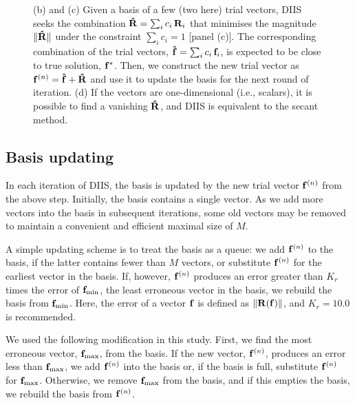 \documentclass{gMOS2e}
\begin{document}
\begin{figure}[h]
\begin{center}
{    %
    (b) and (c)
    Given a basis of a few (two here) trial vectors,
    DIIS seeks the combination
    $\mathbf{\hat R} = \sum_i c_i \, \mathbf{R}_i$
    that minimises the magnitude
    $\| \mathbf{\hat R} \|$
    under the constraint
    $\sum_i c_i = 1$ [panel (c)].
    The corresponding combination
    of the trial vectors,
    $\mathbf{\hat f} = \sum_i c_i \, \mathbf{f}_i$,
    is expected to be close to true solution, $\mathbf{f}^*$.
    Then,
    we construct
    the new trial vector as
    $\mathbf{f}^{(n)} = \mathbf{\hat f} + \mathbf{\hat R}$
    and use it to update the basis
    for the next round of iteration.
    (d) If the vectors are one-dimensional (i.e., scalars),
    it is possible to find a vanishing $\mathbf{\hat R}$, and
    DIIS is equivalent to the secant method.
  }
\end{center}
\end{figure}




\subsection{\label{sec:basis_updating}Basis updating}



In each iteration of DIIS,
the basis is updated
by the new trial vector $\mathbf{f}^{(n)}$
from the above step.
%
Initially,
the basis contains a single vector.
%
As we add more vectors into the basis in subsequent iterations,
some old vectors may be removed
to maintain a convenient and efficient maximal size of $M$.



A simple updating scheme\cite{kovalenko1999}
is to treat the basis as a queue:
%
we add $\mathbf{f}^{(n)}$ to the basis,
if the latter contains fewer than $M$ vectors,
%
or substitute $\mathbf{f}^{(n)}$ for the earliest vector in the basis.
%
If, however, $\mathbf{f}^{(n)}$
produces an error greater than
$K_r$ times the error of
$\mathbf{f}_\mathrm{min}$,
the least erroneous vector in the basis,
%
we rebuild the basis
from $\mathbf{f}_\mathrm{min}$.
%
Here, the error of a vector $\mathbf{f}$ is defined as
$\| \mathbf{R}(\mathbf{f}) \|$,
and
$K_r = 10.0$ is recommended\cite{
kovalenko1999}.



We used the following modification
in this study.
%
%
%
%
First, we find the most erroneous vector,
$\mathbf{f}_\mathrm{max}$, from the basis.
%
If the new vector, $\mathbf{f}^{(n)}$,
produces an error less than $\mathbf{f}_\mathrm{max}$,
we add $\mathbf{f}^{(n)}$ into the basis
or, if the basis is full,
substitute $\mathbf{f}^{(n)}$ for $\mathbf{f}_\mathrm{max}$.
%
Otherwise,
we remove $\mathbf{f}_\mathrm{max}$ from the basis,
and if this empties the basis,
we rebuild the basis from $\mathbf{f}^{(n)}$.
\end{document}
